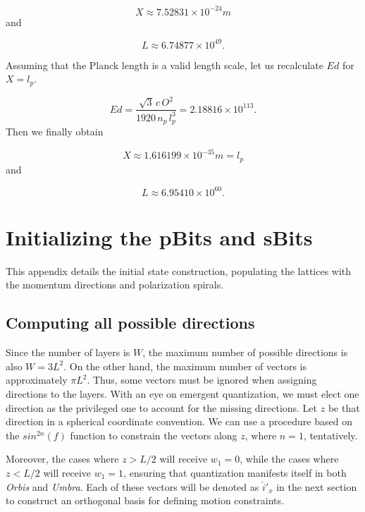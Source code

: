 \documentclass[12pt,english]{article}
\begin{document}
\[
X\approx7.52831\times10^{-24}m
\]
and

\[
L\approx6.74877\times10^{49}.
\]

Assuming that the Planck length is a valid length scale, let us recalculate
$Ed$ for $X=l_{p}$.

\[
Ed=\frac{\sqrt{3}\,c\,O^{2}}{1920\,n_{p}\,l_{p}^{3}}=2.18816\times10^{113}.
\]
Then we finally obtain

\[
X\approx1.616199\times10^{-35}m=l_{p}
\]
and

\[
L\approx6.95410\times10^{60}.
\]


\newpage{}
\section{Initializing the pBits and sBits} \label{sec:pBits-sBits}

This appendix details the initial state construction, populating the lattices with the momentum directions and polarization spirals.

\subsection{Computing all possible directions} \label{subsec:all-dirs}

Since the number of layers is $W$, the maximum number of possible directions is also $W = 3L^2$. On the other hand, the maximum  number of vectors is approximately $\pi L^2$. Thus, some vectors must be ignored when assigning directions to the layers. With an eye on emergent quantization, we must elect one direction as the privileged one to account for the missing directions. Let $z$ be that direction in a spherical coordinate convention. We can use a procedure based on the $sin^{2n}(f)$ function to constrain the vectors along $z$, where $n=1$, tentatively.

Moreover, the cases where $z > L/2$ will receive $w_1 = 0$, while the cases where $z < L/2$ will receive $w_1 = 1$, ensuring that quantization manifests itself in both \textit{Orbis} and \textit{Umbra}. Each of these vectors will be denoted as $\hat{i}'_x$ in the next section to construct an orthogonal basis for defining motion constraints.
\end{document}
